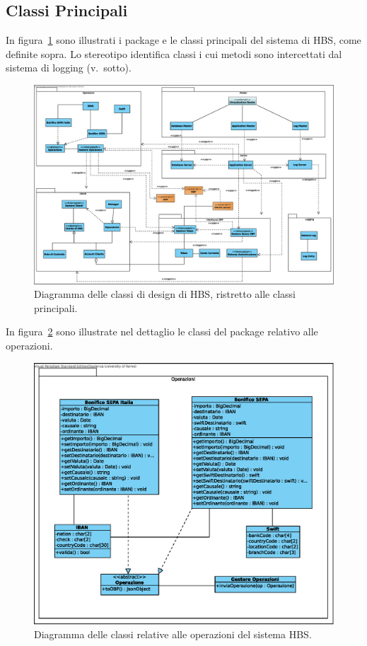 
\subsection{Classi Principali}

In figura~\ref{fig:classi-principali} sono illustrati i package e le classi principali del sistema di HBS, come definite sopra.
Lo stereotipo  identifica classi i cui metodi sono intercettati dal sistema di logging (v.\ sotto).

\begin{figure}[h]
    \centering
    \includegraphics[width=\textheight, angle=90]{Images/Classi_Design.eps}
    \caption{Diagramma delle classi di design di HBS, ristretto alle classi principali.}
    \label{fig:classi-principali}
\end{figure}

In figura~\ref{fig:classi-principali:operazioni} sono illustrate nel dettaglio le classi del package relativo alle operazioni.

\begin{figure}[h]
    \centering
    \includegraphics[width=\textwidth]{Images/Operazioni_Design.eps}
    \caption{Diagramma delle classi relative alle operazioni del sistema HBS.}
    \label{fig:classi-principali:operazioni}
\end{figure}


